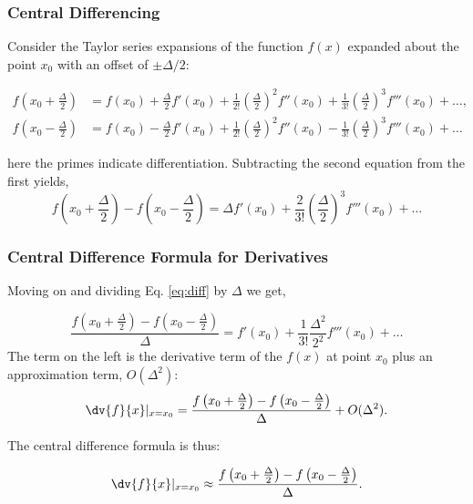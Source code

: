 \documentclass[10pt]{beamer}
\begin{document}
\begin{frame}
    \frametitle{Central Differencing}
    Consider the Taylor series expansions of the function $f(x)$ expanded about the
    point $x_0$ with an offset of $\pm\Delta/2$:

    \begin{align*}
        f(x_0 + \frac{\Delta}{2}) & = f(x_0) + \frac{\Delta}{2} f'(x_0) +
        \frac{1}{2!}\left(\frac{\Delta}{2}\right)^2 f''(x_0) +
        \frac{1}{3!}\left(\frac{\Delta}{2}\right)^3 f'''(x_0) + \ldots,   \\
        f(x_0 - \frac{\Delta}{2}) & = f(x_0) - \frac{\Delta}{2} f'(x_0) +
        \frac{1}{2!}\left(\frac{\Delta}{2}\right)^2 f''(x_0) -
        \frac{1}{3!}\left(\frac{\Delta}{2}\right)^3 f'''(x_0) + \ldots
    \end{align*}

    here the primes indicate differentiation. Subtracting the second equation from the first yields,
    \begin{equation}
        f\left(x_0+\frac{\Delta}{2}\right) -
        f\left(x_0-\frac{\Delta}{2}\right) =
        \Delta f'(x_0) +
        \frac{2}{3!}\left(\frac{\Delta}{2}\right)^3 f'''(x_0) + \ldots
        \label{eq:diff}
    \end{equation}
\end{frame}

\begin{frame}
    \frametitle{Central Difference Formula for Derivatives}

    Moving on and dividing Eq. \ref{eq:diff} by $\Delta$ we get,

    \begin{equation*}
        \frac {f\left(x_0 + \frac{\Delta}{2}\right) -
            f\left(x_0 - \frac{\Delta}{2}\right)}{\Delta} =  f'(x_0) + \frac{1}{3!}\frac{\Delta^2}{2^2} f'''(x_0) + \ldots
    \end{equation*}
    The term on the left is the derivative term of the $f(x)$ at point $x_0$ plus an approximation term, $O(\Delta^2)$:
    \begin{equation*}
        \dv{f}{x}|_{x=x_0} = \frac{f\left(x_0+\frac{\Delta}{2}\right) -f\left(x_0-\frac{\Delta}{2}\right)}{\Delta} + O(\Delta^2).
    \end{equation*}

    The central difference formula is thus:
    \begin{tcolorbox}[colback=blue!5,colframe=university-blue]
        \begin{equation*}
            \dv{f}{x}|_{x=x_0} \approx \frac{f\left(x_0+\frac{\Delta}{2}\right) -
                f\left(x_0-\frac{\Delta}{2}\right)}{\Delta}.
        \end{equation*}
    \end{tcolorbox}
\end{frame}
\end{document}

